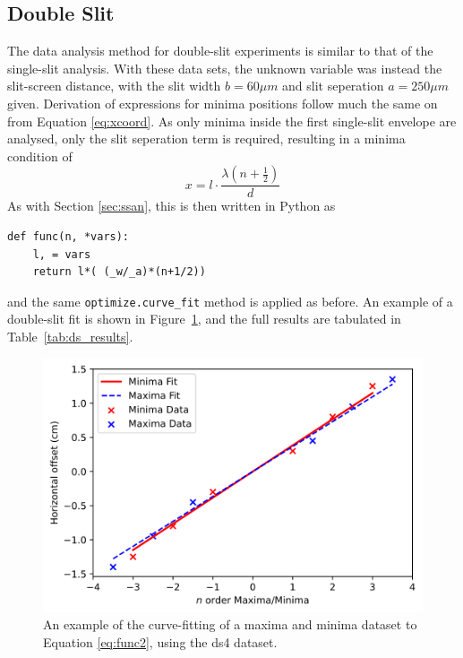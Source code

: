 \documentclass[a4paper]{article}
\begin{document}
\subsection{Double Slit} \label{sec:dsan}
The data analysis method for double-slit experiments is similar to that of the single-slit analysis. With these data sets, the unknown variable was instead the slit-screen distance, with the slit width $b=60\mu m$ and slit seperation $a=250\mu m$ given. Derivation of expressions for minima positions follow much the same on from Equation \ref{eq:xcoord}. As only minima inside the first single-slit envelope are analysed, only the slit seperation term is required, resulting in a minima condition of 
\begin{equation} \label{eq:func2}
x = l\cdot\frac{\lambda(n+\frac12)}d
\end{equation}\newpage
As with Section \ref{sec:ssan}, this is then written in Python as
\begin{lstlisting}[belowskip=-1.5 \baselineskip]
def func(n, *vars):
    l, = vars
    return l*( (_w/_a)*(n+1/2))
\end{lstlisting} and the same \lstinline$optimize.curve_fit$ method is applied as before. An example of a double-slit fit is shown in Figure~\ref{fig:ds_ex}, and the full results are tabulated in Table~\ref{tab:ds_results}.

\begin{figure}[h]
  \centerline{\includegraphics[scale=0.8]{ds_ex.png}}
  \captionsetup{justification=centering}
  \caption{An example of the curve-fitting of a maxima and minima dataset to Equation \ref{eq:func2}, using the ds4 dataset.}
  \label{fig:ds_ex}
\end{figure}
\end{document}

